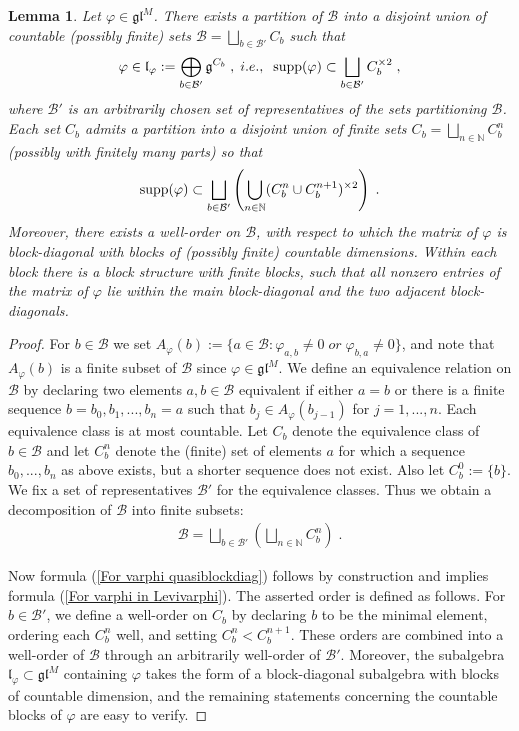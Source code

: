 \documentclass[12pt]{article}
\def\NN {{\mathbb N}}     %
\def\B  {\mathcal B}
\def\mk {\mathfrak}
\newtheorem{lemma}[theorem]{Lemma}
\begin{document}
\begin{lemma}\label{Lemma Levivarphi}
Let $\varphi\in\mk{gl}^M$. There exists a partition of $\B$ into a disjoint union of countable (possibly finite) sets $\B=\bigsqcup\limits_{b\in\B'}C_b$ such that 
\begin{gather}\label{For varphi in Levivarphi}
\varphi\in \mk{l}_\varphi:=\bigoplus\limits_{b\in\B'} \mk g^{C_b} \;,\;i.e.,\;\; {\rm supp}(\varphi)\subset \bigsqcup\limits_{b\in\B'} C_b^{\times 2} \;,
\end{gather}
where $\B'$ is an arbitrarily chosen set of representatives of the sets partitioning $\B$. Each set $C_b$ admits a partition into a disjoint union of finite sets $C_b=\bigsqcup\limits_{n\in\NN}C_b^n$ (possibly with finitely many parts) so that
\begin{gather}\label{For varphi quasiblockdiag}
{\rm supp}(\varphi)\subset \bigsqcup\limits_{b\in\B'} \left( \bigcup\limits_{n\in\NN} (C_b^{n}\cup C_b^{n+1})^{\times 2} \right) \;.
\end{gather}
Moreover, there exists a well-order on $\B$, with respect to which the matrix of $\varphi$ is block-diagonal with blocks of (possibly finite) countable dimensions. Within each block there is a block structure with finite blocks, such that all nonzero entries of the matrix of $\varphi$ lie within the main block-diagonal and the two adjacent block-diagonals. 
\end{lemma}

\begin{proof}
For $b\in \B$ we set $A_\varphi(b):=\{a\in\B:\varphi_{a,b}\ne0\;or\;\varphi_{b,a}\ne0\}$, and note that $A_\varphi(b)$ is a finite subset of $\B$ since $\varphi\in\mk{gl}^M$. We define an equivalence relation on $\B$ by declaring two elements $a,b\in\B$ equivalent if either $a=b$ or there is a finite sequence $b=b_0,b_1,...,b_n=a$ such that $b_{j}\in A_{\varphi}(b_{j-1})$ for $j=1,...,n$. Each equivalence class is at most countable. Let $C_b$ denote the equivalence class of $b\in\B$ and let $C_b^n$ denote the (finite) set of elements $a$ for which a sequence $b_0,...,b_n$ as above exists, but a shorter sequence does not exist. Also let $C_b^0:=\{b\}$. We fix a set of representatives $\B'$ for the equivalence classes. Thus we obtain a decomposition of $\B$ into finite subsets:
\begin{gather}\label{For B as union Cbn}
\B = \bigsqcup\limits_{b\in\B'} \left(\bigsqcup\limits_{n\in\NN} C_b^n\right) \;.
\end{gather}

Now formula (\ref{For varphi quasiblockdiag}) follows by construction and implies formula (\ref{For varphi in Levivarphi}). The asserted order is defined as follows. For $b\in\B'$, we define a well-order on $C_b$ by declaring $b$ to be the minimal element, ordering each $C_b^n$ well, and setting $C_b^n<C_b^{n+1}$. These orders are combined into a well-order of $\B$ through an arbitrarily well-order of $\B'$. Moreover, the subalgebra $\mk l_\varphi \subset\mk{gl}^{M}$ containing $\varphi$ takes the form of a block-diagonal subalgebra with blocks of countable dimension, and the remaining statements concerning the countable blocks of $\varphi$ are easy to verify.
\end{proof}
\end{document}
